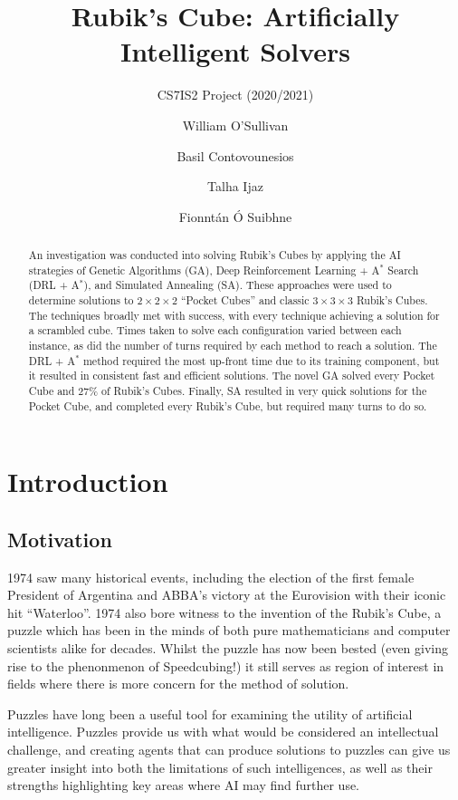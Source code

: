 \documentclass[UKenglish]{svproc}
\title{Rubik's Cube: Artificially Intelligent Solvers}
\subtitle{CS7IS2 Project (2020/2021)}
\author{
  William O'Sullivan   \and
  Basil Contovounesios \and
  Talha Ijaz           \and
  Fionnt\'an \'O Suibhne}
\institute{\email{
    wosulliv@tcd.ie,
    contovob@tcd.ie,
    ijazm@tcd.ie,
    suibhnef@tcd.ie}}
\begin{document}
\mainmatter
\maketitle              %

\begin{abstract}

  An investigation was conducted into solving Rubik's Cubes by applying the AI
  strategies of Genetic Algorithms (GA), Deep Reinforcement Learning + A$^\ast$
  Search (DRL + A$^\ast$), and Simulated Annealing (SA). These approaches were
  used to determine solutions to $2\times 2\times 2$ ``Pocket Cubes'' and
  classic $3\times 3\times 3$ Rubik's Cubes. The techniques broadly met with
  success, with every technique achieving a solution for a scrambled cube. Times
  taken to solve each configuration varied between each instance, as did the
  number of turns required by each method to reach a solution. The DRL +
  A$^\ast$ method required the most up-front time due to its training component,
  but it resulted in consistent fast and efficient solutions. The novel GA
  solved every Pocket Cube and 27\% of Rubik's Cubes. Finally, SA resulted in
  very quick solutions for the Pocket Cube, and completed every Rubik's Cube,
  but required many turns to do so.


\end{abstract}

\section{Introduction}

\subsection{Motivation}
1974 saw many historical events, including the election of the first female President of Argentina and ABBA's victory at the Eurovision with their iconic hit ``Waterloo''. 1974 also bore witness to the invention of the Rubik's Cube, a puzzle which has been in the minds of both pure mathematicians and computer scientists alike for decades. Whilst the puzzle has now been bested (even giving rise to the phenonmenon of Speedcubing!) it still serves as region of interest in fields where there is more concern for the method of solution.

Puzzles have long been a useful tool for examining the utility of artificial intelligence. Puzzles provide us with what would be considered an intellectual challenge, and creating agents that can produce solutions to puzzles can give us greater insight into both the limitations of such intelligences, as well as their strengths highlighting key areas where AI may find further use.
\end{document}
